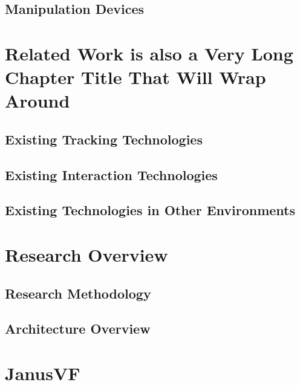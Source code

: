 \documentclass[12pt]{report}	%
\begin{document}
	\section{Manipulation Devices}

\chapter{Related Work is also a Very Long Chapter Title That Will Wrap Around}
	\section{Existing Tracking Technologies}
	\section{Existing Interaction Technologies}
	\section{Existing Technologies in Other Environments}

\chapter{Research Overview}
	\section{Research Methodology}
	\section{Architecture Overview}

\chapter{JanusVF}
\end{document}
